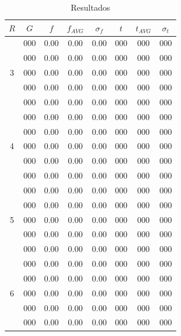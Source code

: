 \documentclass[journal]{IEEEtran}
\begin{document}
\begin{table}[h]
\caption{Resultados}
\centering

\begin{tabular}{|c||c||c|c|c||c|c|c|}
\hline
$R$ & $G$ & $f$ & $f_{AVG}$ & $\sigma_f$ & $t$ & $t_{AVG}$ & $\sigma_t$ \\
\hline
\multirow{5}{*}{3} & 000 & 0.00 & 0.00 & 0.00 & 000 & 000 & 000 \\
                   & 000 & 0.00 & 0.00 & 0.00 & 000 & 000 & 000 \\
                   & 000 & 0.00 & 0.00 & 0.00 & 000 & 000 & 000 \\
                   & 000 & 0.00 & 0.00 & 0.00 & 000 & 000 & 000 \\
                   & 000 & 0.00 & 0.00 & 0.00 & 000 & 000 & 000 \\\hline

\multirow{5}{*}{4} & 000 & 0.00 & 0.00 & 0.00 & 000 & 000 & 000 \\
                   & 000 & 0.00 & 0.00 & 0.00 & 000 & 000 & 000 \\
                   & 000 & 0.00 & 0.00 & 0.00 & 000 & 000 & 000 \\
                   & 000 & 0.00 & 0.00 & 0.00 & 000 & 000 & 000 \\
                   & 000 & 0.00 & 0.00 & 0.00 & 000 & 000 & 000 \\\hline

\multirow{5}{*}{5} & 000 & 0.00 & 0.00 & 0.00 & 000 & 000 & 000 \\
                   & 000 & 0.00 & 0.00 & 0.00 & 000 & 000 & 000 \\
                   & 000 & 0.00 & 0.00 & 0.00 & 000 & 000 & 000 \\
                   & 000 & 0.00 & 0.00 & 0.00 & 000 & 000 & 000 \\
                   & 000 & 0.00 & 0.00 & 0.00 & 000 & 000 & 000 \\\hline

\multirow{5}{*}{6} & 000 & 0.00 & 0.00 & 0.00 & 000 & 000 & 000 \\
                   & 000 & 0.00 & 0.00 & 0.00 & 000 & 000 & 000 \\
                   & 000 & 0.00 & 0.00 & 0.00 & 000 & 000 & 000 \\
                   & 000 & 0.00 & 0.00 & 0.00 & 000 & 000 & 000 \\
                   & 000 & 0.00 & 0.00 & 0.00 & 000 & 000 & 000 \\\hline


\end{tabular}
\end{table}
\end{document}
